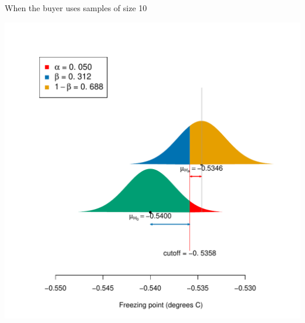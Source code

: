 \documentclass[10pt,handout]{beamer}\usepackage[]{graphicx}\usepackage[]{color}
\makeatletter
\def\maxwidth{ %
  \ifdim\Gin@nat@width>\linewidth
    \linewidth
  \else
    \Gin@nat@width
  \fi
}
\newenvironment{knitrout}{}{} %
\makeatother
\begin{document}
\begin{frame}[fragile]{When the buyer uses samples of size 10}
\begin{knitrout}\tiny
{}\color{fgcolor}

{\centering \includegraphics[width=\maxwidth]{figure/unnamed-chunk-13-1} 

}


\end{knitrout}
\end{frame}
\end{document}
